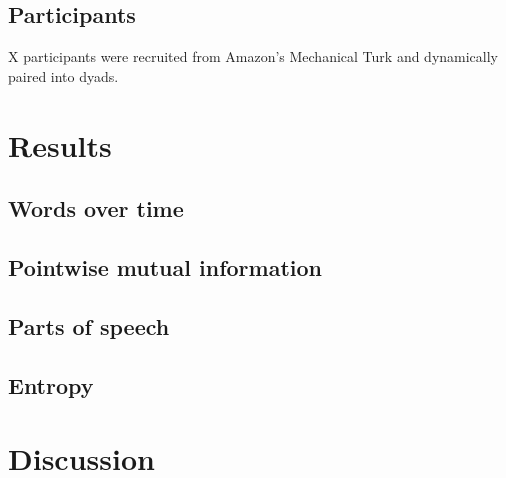 \documentclass[12pt, floatsintext, jou]{apa6}
\begin{document}
\subsection{Participants} 

X participants were recruited from Amazon's Mechanical Turk and dynamically paired into dyads. 

\section{Results}

\subsection{Words over time}

\subsection{Pointwise mutual information}

\subsection{Parts of speech}

\subsection{Entropy}

\section{Discussion}





\end{document}
